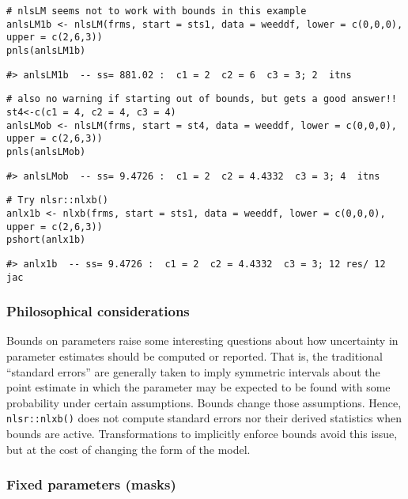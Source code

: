 \begin{verbatim}
# nlsLM seems not to work with bounds in this example
anlsLM1b <- nlsLM(frms, start = sts1, data = weeddf, lower = c(0,0,0), upper = c(2,6,3))
pnls(anlsLM1b)
\end{verbatim}

\begin{verbatim}
#> anlsLM1b  -- ss= 881.02 :  c1 = 2  c2 = 6  c3 = 3; 2  itns
\end{verbatim}

\begin{verbatim}
# also no warning if starting out of bounds, but gets a good answer!!
st4<-c(c1 = 4, c2 = 4, c3 = 4)
anlsLMob <- nlsLM(frms, start = st4, data = weeddf, lower = c(0,0,0), upper = c(2,6,3))
pnls(anlsLMob)
\end{verbatim}

\begin{verbatim}
#> anlsLMob  -- ss= 9.4726 :  c1 = 2  c2 = 4.4332  c3 = 3; 4  itns
\end{verbatim}

\begin{verbatim}
# Try nlsr::nlxb()
anlx1b <- nlxb(frms, start = sts1, data = weeddf, lower = c(0,0,0), upper = c(2,6,3))
pshort(anlx1b)
\end{verbatim}

\begin{verbatim}
#> anlx1b  -- ss= 9.4726 :  c1 = 2  c2 = 4.4332  c3 = 3; 12 res/ 12 jac
\end{verbatim}

\hypertarget{philosophical-considerations}{%
\subsubsection{Philosophical considerations}\label{philosophical-considerations}}

Bounds on parameters raise some interesting questions about how
uncertainty in parameter estimates should be computed or reported. That is, the
traditional ``standard errors'' are generally taken to imply symmetric intervals about
the point estimate in which the parameter may be expected to be found with some
probability under certain assumptions.
Bounds change those assumptions. Hence, \texttt{nlsr::nlxb()} does not compute standard
errors nor their derived statistics when bounds are active. Transformations to
implicitly enforce bounds avoid this issue, but at the cost of changing the
form of the model.

\hypertarget{fixed-parameters-masks}{%
\subsubsection{Fixed parameters (masks)}\label{fixed-parameters-masks}}

